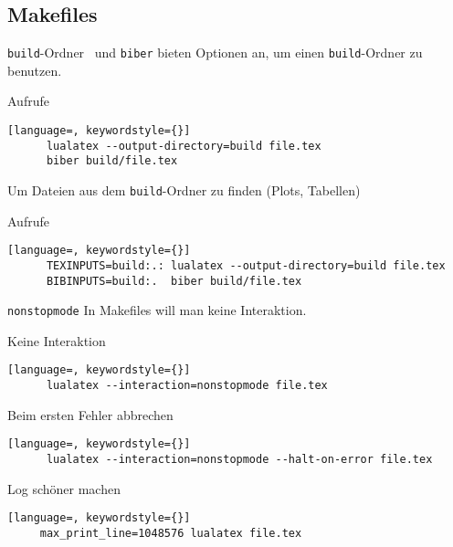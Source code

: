 \subsection{Makefiles}

\begin{frame}[fragile]{\texttt{build}-Ordner}
  \LuaTeX\ und \texttt{biber} bieten Optionen an, um einen \texttt{build}-Ordner zu benutzen.
  \begin{block}{Aufrufe}
    \begin{lstlisting}[language=, keywordstyle={}]
      lualatex --output-directory=build file.tex
      biber build/file.tex
    \end{lstlisting}
  \end{block}

  Um Dateien aus dem \texttt{build}-Ordner zu finden (Plots, Tabellen)
  \begin{block}{Aufrufe}
    \begin{lstlisting}[language=, keywordstyle={}]
      TEXINPUTS=build:.: lualatex --output-directory=build file.tex
      BIBINPUTS=build:.  biber build/file.tex
    \end{lstlisting}
  \end{block}
\end{frame}

\begin{frame}[fragile]{\texttt{nonstopmode}}
  In Makefiles will man keine Interaktion.

  \begin{block}{Keine Interaktion}
    \begin{lstlisting}[language=, keywordstyle={}]
      lualatex --interaction=nonstopmode file.tex
    \end{lstlisting}
  \end{block}

  \begin{block}{Beim ersten Fehler abbrechen}
    \begin{lstlisting}[language=, keywordstyle={}]
      lualatex --interaction=nonstopmode --halt-on-error file.tex
    \end{lstlisting}
  \end{block}

  \begin{block}{Log schöner machen}
    \begin{lstlisting}[language=, keywordstyle={}]
     max_print_line=1048576 lualatex file.tex
    \end{lstlisting}
  \end{block}
\end{frame}
